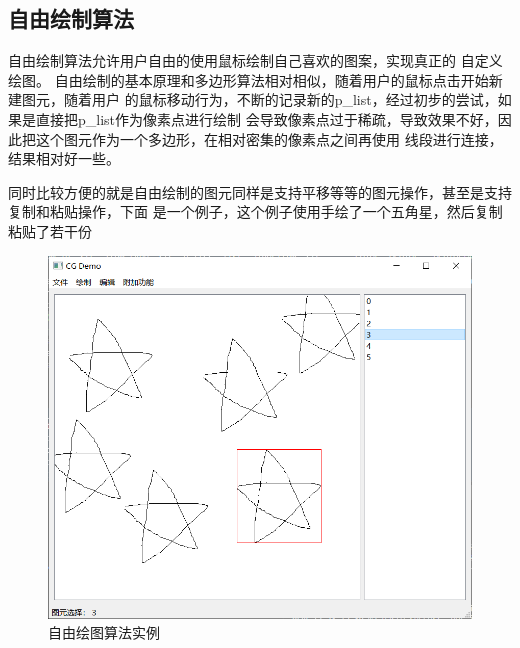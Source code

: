\documentclass[a4paper,UTF8]{article}
\theoremstyle{definition}
\begin{document}
\subsection{自由绘制算法}
自由绘制算法允许用户自由的使用鼠标绘制自己喜欢的图案，实现真正的
自定义绘图。
自由绘制的基本原理和多边形算法相对相似，随着用户的鼠标点击开始新建图元，随着用户
的鼠标移动行为，不断的记录新的p\_list，经过初步的尝试，如果是直接把p\_list作为像素点进行绘制
会导致像素点过于稀疏，导致效果不好，因此把这个图元作为一个多边形，在相对密集的像素点之间再使用
线段进行连接，结果相对好一些。

同时比较方便的就是自由绘制的图元同样是支持平移等等的图元操作，甚至是支持复制和粘贴操作，下面
是一个例子，这个例子使用手绘了一个五角星，然后复制粘贴了若干份
\begin{figure}[htb]
	\centering
	\includegraphics[scale=0.4]{figure/freedraw.png}
	\caption{自由绘图算法实例}
	\label{fig:freedraw}
\end{figure}
\end{document}
